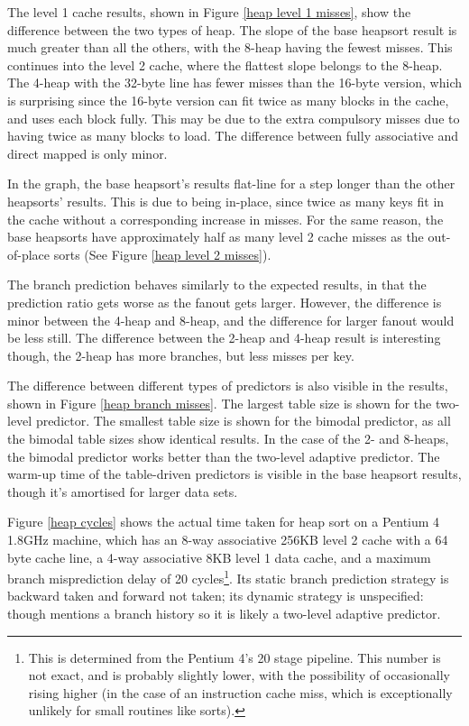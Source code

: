 The level 1 cache results, shown in Figure \ref{heap level 1 misses}, show the
difference between the two types of heap. The slope of the base heapsort result
is much greater than all the others, with the 8-heap having the fewest misses.
This continues into the level 2 cache, where the flattest slope belongs to the
8-heap. The 4-heap with the 32-byte line has fewer misses than the 16-byte
version, which is surprising since the 16-byte version can fit twice as many
blocks in the cache, and uses each block fully.  This may be due to the extra
compulsory misses due to having twice as many blocks to load. The difference
between fully associative and direct mapped is only minor.

In the graph, the base heapsort's results flat-line for a step longer than the
other heapsorts' results. This is due to being in-place, since twice as many
keys fit in the cache without a corresponding increase in misses. For the same
reason, the base heapsorts have approximately half as many level 2 cache misses
as the out-of-place sorts (See Figure \ref{heap level 2 misses}).

The branch prediction behaves similarly to the expected results, in that the
prediction ratio gets worse as the fanout gets larger. However, the difference
is minor between the 4-heap and 8-heap, and the difference for larger fanout
would be less still. The difference between the 2-heap and 4-heap result is
interesting though, the 2-heap has more branches, but less misses per key.

The difference between different types of predictors is also visible in the
results, shown in Figure \ref{heap branch misses}. The largest table size is
shown for the two-level predictor. The smallest table size is shown for the
bimodal predictor, as all the bimodal table sizes show identical results.  In
the case of the 2- and 8-heaps, the bimodal predictor works better than the
two-level adaptive predictor. The warm-up time of the table-driven predictors is
visible in the base heapsort results, though it's amortised for larger data
sets.

Figure \ref{heap cycles} shows the actual time taken for heap sort on a Pentium
4 1.8GHz machine, which has an 8-way associative 256KB level 2 cache with a 64 byte
cache line, a 4-way associative 8KB level 1 data cache, and a maximum branch
misprediction delay of 20 cycles\footnote{This is determined from the Pentium
4's 20 stage pipeline. This number is not exact, and is probably slightly lower,
with the possibility of occasionally rising higher (in the case of an
instruction cache miss, which is exceptionally unlikely for small routines like
sorts).}. Its static branch prediction strategy is backward taken and forward
not taken; its dynamic strategy is unspecified: though \cite{Intel248966-010}
mentions a branch history so it is likely a two-level adaptive predictor.


